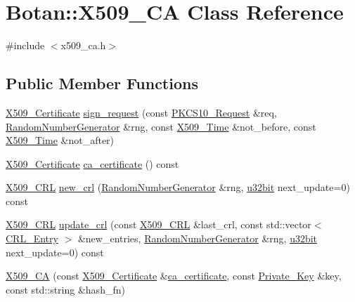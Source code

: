 \hypertarget{classBotan_1_1X509__CA}{\section{Botan\-:\-:X509\-\_\-\-C\-A Class Reference}
\label{classBotan_1_1X509__CA}
}


{\ttfamily \#include $<$x509\-\_\-ca.\-h$>$}

\subsection*{Public Member Functions}
\begin{DoxyCompactItemize}
\item 
\hyperlink{classBotan_1_1X509__Certificate}{X509\-\_\-\-Certificate} \hyperlink{classBotan_1_1X509__CA_a2a74d0e0060ef3bd71f8ac7dfe3cb08c}{sign\-\_\-request} (const \hyperlink{classBotan_1_1PKCS10__Request}{P\-K\-C\-S10\-\_\-\-Request} \&req, \hyperlink{classBotan_1_1RandomNumberGenerator}{Random\-Number\-Generator} \&rng, const \hyperlink{classBotan_1_1X509__Time}{X509\-\_\-\-Time} \&not\-\_\-before, const \hyperlink{classBotan_1_1X509__Time}{X509\-\_\-\-Time} \&not\-\_\-after)
\item 
\hyperlink{classBotan_1_1X509__Certificate}{X509\-\_\-\-Certificate} \hyperlink{classBotan_1_1X509__CA_a78ee3a57f79a5297b56b47c39d31cf1e}{ca\-\_\-certificate} () const 
\item 
\hyperlink{classBotan_1_1X509__CRL}{X509\-\_\-\-C\-R\-L} \hyperlink{classBotan_1_1X509__CA_aacef32db4c9d4398c7ac321bdece4752}{new\-\_\-crl} (\hyperlink{classBotan_1_1RandomNumberGenerator}{Random\-Number\-Generator} \&rng, \hyperlink{namespaceBotan_aacc7d03c95e97e76168fc1c819031830}{u32bit} next\-\_\-update=0) const 
\item 
\hyperlink{classBotan_1_1X509__CRL}{X509\-\_\-\-C\-R\-L} \hyperlink{classBotan_1_1X509__CA_a4a738b3ce5d8203c6878dee33a62420d}{update\-\_\-crl} (const \hyperlink{classBotan_1_1X509__CRL}{X509\-\_\-\-C\-R\-L} \&last\-\_\-crl, const std\-::vector$<$ \hyperlink{classBotan_1_1CRL__Entry}{C\-R\-L\-\_\-\-Entry} $>$ \&new\-\_\-entries, \hyperlink{classBotan_1_1RandomNumberGenerator}{Random\-Number\-Generator} \&rng, \hyperlink{namespaceBotan_aacc7d03c95e97e76168fc1c819031830}{u32bit} next\-\_\-update=0) const 
\item 
\hyperlink{classBotan_1_1X509__CA_a07a9ec809251e971c20e9df294f8d0a5}{X509\-\_\-\-C\-A} (const \hyperlink{classBotan_1_1X509__Certificate}{X509\-\_\-\-Certificate} \&\hyperlink{classBotan_1_1X509__CA_a78ee3a57f79a5297b56b47c39d31cf1e}{ca\-\_\-certificate}, const \hyperlink{classBotan_1_1Private__Key}{Private\-\_\-\-Key} \&key, const std\-::string \&hash\-\_\-fn)
\end{DoxyCompactItemize}
